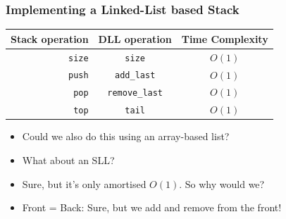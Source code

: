 \begin{frame}
	\frametitle{Implementing a Linked-List based Stack}
			\begin{tabular}{r | c c}
				Stack operation & DLL operation & Time Complexity \\
				\midrule
				\texttt{size} & \texttt{size} & $O(1)$ \\
				\texttt{push} & \texttt{add\_last} & $O(1)$ \\
				\texttt{pop}  & \texttt{remove\_last} & $O(1)$ \\
				\texttt{top}  & \texttt{tail} & $O(1)$ \\
			\end{tabular}
		
				\begin{itemize}
					\item Could we also do this using an array-based list?	
					\item What about an SLL?
					\item Sure, but it's only amortised $O(1)$. So why would we?
					\item Front = Back: Sure, but we add and remove from the front!
			\end{itemize}

\end{frame}

